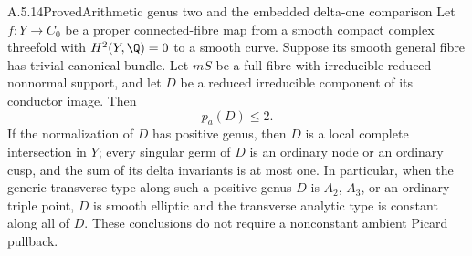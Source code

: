 \begin{statement}{A.5.14}{Proved}{Arithmetic genus two and the embedded delta-one comparison}
Let $f:Y\to C_0$ be a proper connected-fibre map from a
smooth compact complex threefold with $H^2(Y,\Q)=0$ to
a smooth curve. Suppose its smooth general fibre has
trivial canonical bundle. Let $mS$ be a full fibre with
irreducible reduced nonnormal support, and let $D$ be
a reduced irreducible component of its conductor image.
Then
\[
                         p_a(D)\le2.                \tag{A.J.30}
\]
If the normalization of $D$ has positive genus, then
$D$ is a local complete intersection in $Y$; every
singular germ of $D$ is an ordinary node or an ordinary
cusp, and the sum of its delta invariants is at most
one. In particular, when the generic transverse type
along such a positive-genus $D$ is $A_2$, $A_3$, or an
ordinary triple point, $D$ is smooth elliptic and the
transverse analytic type is constant along all of $D$.
These conclusions do not require a nonconstant ambient
Picard pullback.
\end{statement}
